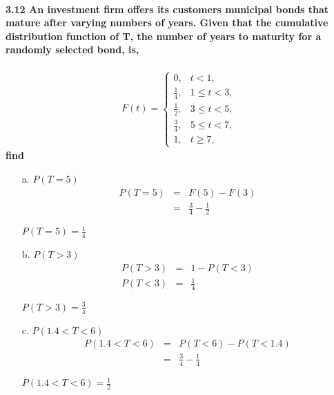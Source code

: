 \documentclass{article}
\begin{document}
\paragraph{3.12 An investment firm offers its customers municipal 
bonds that mature after varying numbers of years. Given that the 
cumulative distribution function of T, the number of years to maturity 
for a randomly selected bond, is,}
\begin{eqnarray*}
F(t) = \left\{\begin{array}{ll}
  0, & t < 1,\\
  \frac{1}{4}, & 1 \leq t < 3,\\
  \frac{1}{2}, & 3 \leq t < 5,\\
  \frac{3}{4}, & 5 \leq t < 7,\\
  1, & t \geq 7,
  \end{array}\right.
\end{eqnarray*}
\textbf{find}
\begin{enumerate}
\item[a.] $P(T = 5)$
\begin{eqnarray*}
  P(T=5) & = & F(5)-F(3)\\
         & = & \frac{3}{4}-\frac{1}{2}
\end{eqnarray*}
\begin{center}
$\boxed{P(T=5)=\frac{1}{4}}$
\end{center}

\item[b.] $P(T > 3)$
\begin{eqnarray*}
  P(T>3) & = & 1-P(T<3)\\
  P(T<3) & = & \frac{1}{4}
\end{eqnarray*}
\begin{center}
$\boxed{P(T>3) = \frac{3}{4}}$
\end{center}

\item[c.] $P(1.4 < T < 6)$
\begin{eqnarray*}
  P(1.4<T<6) & = & P(T<6)-P(T<1.4)\\
             & = & \frac{3}{4}-\frac{1}{4}
\end{eqnarray*}
\begin{center}
$\boxed{P(1.4<T<6)=\frac{1}{2}}$
\end{center}
\end{enumerate}
\end{document}
